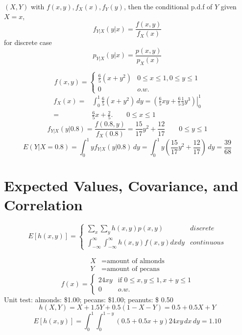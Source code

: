 \begin{defn}
$(X,Y)$ with $f(x,y),f_X(x),f_Y(y)$, then the conditional p.d.f of $Y$ given $X=x$,
\[f_{Y|X}(y|x)=\frac{f(x,y)}{f_X(x)}\]
for discrete case
\[p_{Y|X}(y|x)=\frac{p(x,y)}{p_X(x)}\]
\end{defn}

\begin{exmp}
\[f(x,y)=\begin{cases}
\frac{6}{5} (x+y^2) & 0\leq x\leq 1,0\leq y\leq 1 \\
0 & o.w.
\end{cases}\]
\begin{align*}
f_X(x)=& \int_0^1 \frac{6}{5} (x+y^2) \,dy = \left.\left( \frac{6}{5}xy +\frac{6}{5}\frac{1}{3}y^3\right)\right|_0^1\\
=& \frac{6}{5} x +\frac{2}{5}. \qquad 0\leq x \leq 1 
\end{align*}
\[f_{Y|X}(y|0.8)=\frac{f(0.8,y)}{f_X(0.8)}=\frac{15}{17}y^2+\frac{12}{17} \qquad 0\leq y \leq 1 \]
\[E(Y|X=0.8)=\int_0^1 y f_{Y|X}(y|0.8) \,dy=\int_0^1 y\left(\frac{15}{17}y^2+\frac{12}{17}\right)\,dy=\frac{39}{68}\]
\end{exmp}

\section{Expected Values, Covariance, and Correlation}
\begin{prop}
\[E[h(x,y)]=\begin{cases}
\sum_{x}\sum_{y} h(x,y)p(x,y) & discrete \\
\int_{-\infty}^{\infty} \int_{-\infty}^{\infty} h(x,y) f(x,y) dx dy & continuous
\end{cases}\]
\end{prop}

\begin{exmp}
\begin{align*}
X &= \text{amount of almonds}\\
Y &= \text{amount of pecans}
\end{align*}
\[f(x)=
\begin{cases}
24xy & \text{if }0\leq x,y\leq1, x+y\leq1\\
0 & o.w. 
\end{cases}\]
Unit test: almonds: \$1.00; pecans: \$1.00; peanuts: \$ 0.50
\[h(X,Y)=X+1.5Y+0.5(1-X-Y)=0.5+0.5X+Y\]
\[E[h(x,y)]=\int_{0}^{1} \int_{0}^{1-y}(0.5+0.5x+y)24xy \,dx \,dy=1.10\]
\end{exmp}

